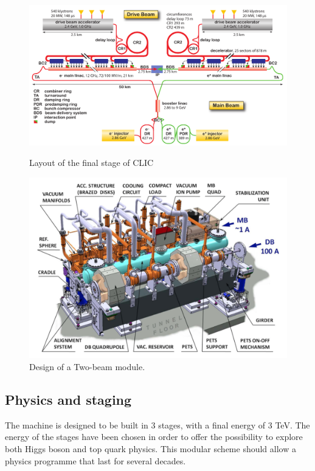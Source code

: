 \begin{figure}
\centering

\includegraphics[scale=0.39]{pictures/CLIC_layout_3Tev}
\caption{Layout of the final stage of CLIC}
\label{CLIC_layout}

\hspace{8mm}

\includegraphics[scale=0.39]{pictures/TBM}
\caption{Design of a Two-beam module. }
\label{TBM}

\end{figure}





\subsection{Physics and staging}

The machine is designed to be built in 3 stages, with a final energy of 3 TeV. The energy of the stages have been chosen in order to offer the possibility to explore both Higgs boson and top quark physics. This modular scheme should allow a physics programme that last for several decades.

